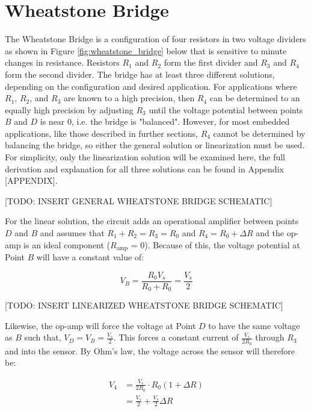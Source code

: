 \chapter{Wheatstone Bridge} \label{chap:wheatstone_bridge}
The Wheatstone Bridge is a configuration of four resistors in two voltage dividers as shown in Figure \ref{fig:wheatstone_bridge} below that is sensitive to minute changes in resistance.
Resistors $R_1$ and $R_2$ form the first divider and $R_3$ and $R_4$ form the second divider.
The bridge has at least three different solutions, depending on the configuration and desired application.
For applications where $R_1$, $R_2$, and $R_3$ are known to a high precision, then $R_4$ can be determined to an equally high precision by adjusting $R_3$ until the voltage potential between points $B$ and $D$ is near 0, i.e. the bridge is "balanced".
However, for most embedded applications, like those described in further sections, $R_4$ cannot be determined by balancing the bridge, so either the general solution or linearization must be used.
For simplicity, only the linearization solution will be examined here, the full derivation and explanation for all three solutions can be found in Appendix [APPENDIX].

[TODO: INSERT GENERAL WHEATSTONE BRIDGE SCHEMATIC]

For the linear solution, the circuit adds an operational amplifier between points $D$ and $B$ and assumes that $R_1+R_2=R_3=R_0$ and $R_4 = R_0 + \Delta R$ and the op-amp is an ideal component ($R_{\text{amp}}$ = 0).
Because of this, the voltage potential at Point $B$ will have a constant value of:

\begin{equation*}
    V_B = \frac{R_0 V_s}{R_0 + R_0} = \frac{V_s}{2}
\end{equation*}

[TODO: INSERT LINEARIZED WHEATSTONE BRIDGE SCHEMATIC]

Likewise, the op-amp will force the voltage at Point $D$ to have the same voltage as $B$ such that, $V_D = V_B = \frac{V_s}{2} $.
This forces a constant current of $\frac{V_s}{2R_0} $ through $R_3$ and into the sensor.
By Ohm's law, the voltage across the sensor will therefore be:

\begin{align*}
    V_4 &= \frac{V_s}{2R_0} \cdot R_0(1+\Delta R) \\
        &= \frac{V_s}{2} + \frac{V_s}{2} \Delta R
\end{align*}

